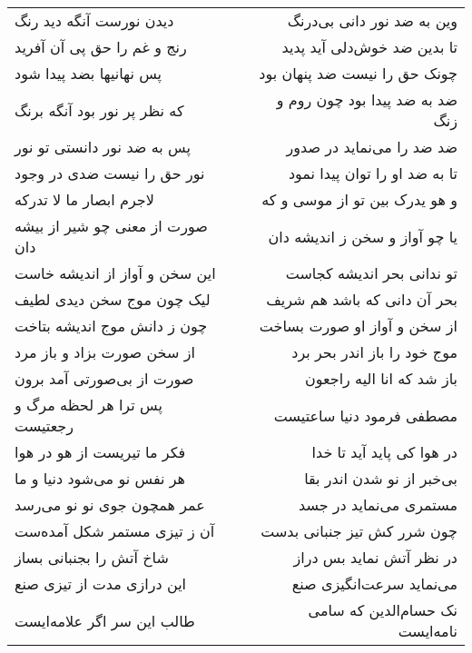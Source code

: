 \begin{center}
\begin{longtable}{l p{0.5cm} r}
دیدن نورست آنگه دید رنگ
&&
وین به ضد نور دانی بی‌درنگ
\\
رنج و غم را حق پی آن آفرید
&&
تا بدین ضد خوش‌دلی آید پدید
\\
پس نهانیها بضد پیدا شود
&&
چونک حق را نیست ضد پنهان بود
\\
که نظر پر نور بود آنگه برنگ
&&
ضد به ضد پیدا بود چون روم و زنگ
\\
پس به ضد نور دانستی تو نور
&&
ضد ضد را می‌نماید در صدور
\\
نور حق را نیست ضدی در وجود
&&
تا به ضد او را توان پیدا نمود
\\
لاجرم ابصار ما لا تدرکه
&&
و هو یدرک بین تو از موسی و که
\\
صورت از معنی چو شیر از بیشه دان
&&
یا چو آواز و سخن ز اندیشه دان
\\
این سخن و آواز از اندیشه خاست
&&
تو ندانی بحر اندیشه کجاست
\\
لیک چون موج سخن دیدی لطیف
&&
بحر آن دانی که باشد هم شریف
\\
چون ز دانش موج اندیشه بتاخت
&&
از سخن و آواز او صورت بساخت
\\
از سخن صورت بزاد و باز مرد
&&
موج خود را باز اندر بحر برد
\\
صورت از بی‌صورتی آمد برون
&&
باز شد که انا الیه راجعون
\\
پس ترا هر لحظه مرگ و رجعتیست
&&
مصطفی فرمود دنیا ساعتیست
\\
فکر ما تیریست از هو در هوا
&&
در هوا کی پاید آید تا خدا
\\
هر نفس نو می‌شود دنیا و ما
&&
بی‌خبر از نو شدن اندر بقا
\\
عمر همچون جوی نو نو می‌رسد
&&
مستمری می‌نماید در جسد
\\
آن ز تیزی مستمر شکل آمده‌ست
&&
چون شرر کش تیز جنبانی بدست
\\
شاخ آتش را بجنبانی بساز
&&
در نظر آتش نماید بس دراز
\\
این درازی مدت از تیزی صنع
&&
می‌نماید سرعت‌انگیزی صنع
\\
طالب این سر اگر علامه‌ایست
&&
نک حسام‌الدین که سامی نامه‌ایست
\\
\end{longtable}
\end{center}
